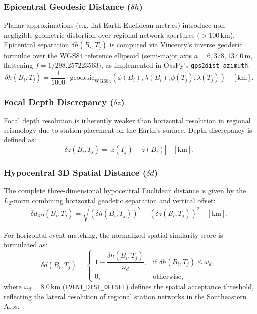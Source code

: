 \subsubsection{Epicentral Geodesic Distance ($\delta h$)}
Planar approximations (e.g. flat-Earth Euclidean metrics) introduce non-negligible geometric distortion over regional network apertures ($> 100\,\mathrm{km}$). Epicentral separation $\delta h(B_i, T_j)$ is computed via Vincenty's inverse geodetic formulae over the WGS84 reference ellipsoid (semi-major axis $a = 6{,}378{,}137.0\,\mathrm{m}$, flattening $f = 1/298.257223563$), as implemented in ObsPy's \texttt{gps2dist\_azimuth}:
\begin{equation}
  \delta h(B_i, T_j) = \frac{1}{1000} \cdot \mathrm{geodesic}_{\mathrm{WGS84}}\left( \phi(B_i), \lambda(B_i), \phi(T_j), \lambda(T_j) \right) \quad [\mathrm{km}].
\end{equation}

\subsubsection{Focal Depth Discrepancy ($\delta z$)}
Focal depth resolution is inherently weaker than horizontal resolution in regional seismology due to station placement on the Earth's surface. Depth discrepancy is defined as:
\begin{equation}
  \delta z(B_i, T_j) = |z(T_j) - z(B_i)| \quad [\mathrm{km}].
\end{equation}

\subsubsection{Hypocentral 3D Spatial Distance ($\delta d$)}
The complete three-dimensional hypocentral Euclidean distance is given by the $L_2$-norm combining horizontal geodetic separation and vertical offset:
\begin{equation}
  \delta d_{3D}(B_i, T_j) = \sqrt{\left( \delta h(B_i, T_j) \right)^2 + \left( \delta z(B_i, T_j) \right)^2} \quad [\mathrm{km}].
\end{equation}

For horizontal event matching, the normalized spatial similarity score is formulated as:
\begin{equation}
  \delta d(B_i, T_j) = \begin{cases}
    1 - \dfrac{\delta h(B_i, T_j)}{\omega_d}, & \text{if } \delta h(B_i, T_j) \le \omega_d, \\[8pt]
    0, & \text{otherwise},
  \end{cases}
\end{equation}
where $\omega_d = 8.0\,\mathrm{km}$ (\texttt{EVENT\_DIST\_OFFSET}) defines the spatial acceptance threshold, reflecting the lateral resolution of regional station networks in the Southeastern Alps.

